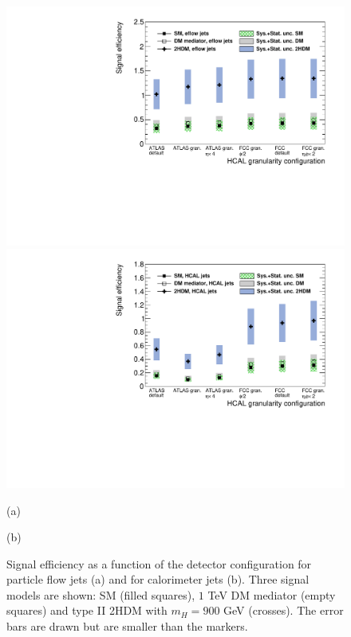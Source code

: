 \begin{figure}
	\centering
	\begin{minipage}{.5\textwidth}
		\centering
		\includegraphics[trim={.6cm 0 0 0},clip,width=\linewidth]{./Figures/EffvsGran_PFjets.pdf}
	\end{minipage}%
	\begin{minipage}{.5\textwidth}
		\centering
		\includegraphics[trim={0 0 .6cm 0},clip,width=\linewidth]{./Figures/EffvsGran_CALOjets.pdf}
	\end{minipage}
	\begin{minipage}[t]{0.5\textwidth}
		\caption*{(a)}
	\end{minipage}%
	\hfill
	\begin{minipage}[t]{0.5\textwidth}
		\caption*{(b)}
	\end{minipage}
	\caption{Signal efficiency as a function of the detector configuration for particle flow jets (a) and for calorimeter jets (b). Three signal models are shown: SM (filled squares), $1$ TeV DM mediator (empty squares) and type II 2HDM with $m_H=900$ GeV (crosses). The error bars are drawn but are smaller than the markers.}
	\label{fig:EffvsGran}
\end{figure}

